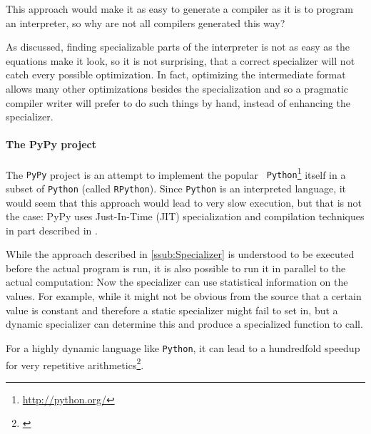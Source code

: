 This approach would make it as easy to generate a compiler as it is to 
program an interpreter, so why are not all compilers generated this way?

As discussed, finding specializable parts of the interpreter is not as easy 
as the equations make it look, so it is not surprising, that a correct 
specializer will not catch every possible optimization. In fact, optimizing 
the intermediate format allows many other optimizations besides the
specialization and so a pragmatic compiler writer will prefer to do such 
things by hand, instead of enhancing the specializer.


\paragraph{The PyPy project} %
\label{par:The PyPy project}
\begin{example}
	The {\tt PyPy} project is an attempt to implement the popular {\tt
	Python}\footnote{\url{http://python.org/}} itself in a subset of {\tt Python}
	(called {\tt RPython}). Since {\tt Python} is an interpreted language, it
	would seem that this approach would lead to very slow execution, but that is
	not the case: PyPy uses Just-In-Time (JIT) specialization and compilation
	techniques in part described in \cite{psycho}.

	While the approach described in \ref{ssub:Specializer} is understood to be 
	executed before the actual program is run, it is also possible to run it 
	in parallel to the actual computation: Now the specializer can use 
	statistical information on the values. For example, while it might not be 
	obvious from the source that a certain value is constant and therefore a 
	static specializer might fail to set in, but a dynamic specializer can 
	determine this and produce a specialized function to call.

	For a highly dynamic language like {\tt Python}, it can lead to a hundredfold 
	speedup for very repetitive arithmetics\footnote{\cite{psycho}}.
\end{example}


